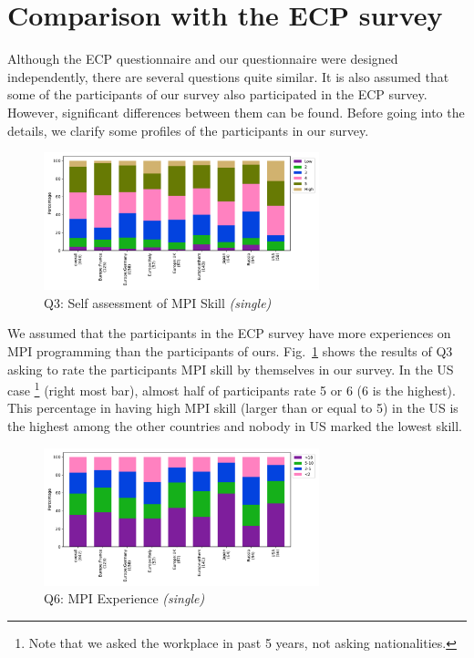\documentclass[conference,10pt,letterpaper]{IEEEtran}
\begin{document}
\section{Comparison with the ECP survey}

Although the ECP questionnaire and our questionnaire were designed
independently, there are several questions quite similar. It is also
assumed that some of the participants of our survey 
also participated in the ECP survey. However, significant differences
between them can be found. Before going into the details, we clarify
some profiles of the participants in our survey.

\begin{figure}[htb]
\begin{center}
\includegraphics[width=8cm]{Figs/Q3.pdf}
\caption{Q3: Self assessment of MPI Skill {\it(single)}}
\label{fig:mpi-skill}
\end{center}
\end{figure}

We assumed that the participants in the ECP survey have more
experiences on MPI
programming than the participants of ours. Fig.~\ref{fig:mpi-skill} 
shows the results of Q3 asking to rate the participants MPI skill by
themselves in our survey.  In the US case 
\footnote{Note that we asked
  the workplace in past 5 years, not asking nationalities.}
(right most bar), almost half of participants rate 5 or 6
(6 is the highest). This percentage in having high MPI skill (larger
than or equal to 5) in the US is the highest among the other
countries and nobody in US marked the lowest skill.

\begin{figure}[htb]
\begin{center}
\includegraphics[width=8cm]{Figs/Q6.pdf}
\caption{Q6: MPI Experience {\it(single)}}
\label{fig:mpi-experience}
\end{center}
\end{figure}
\end{document}
